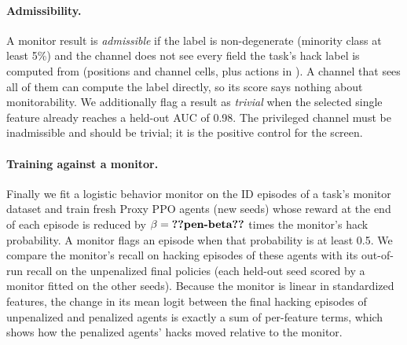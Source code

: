 \paragraph{Admissibility.} A monitor result is \emph{admissible} if the label is
non-degenerate (minority class at least 5\%) and the channel does not see every
field the task's hack label is computed from (positions and channel cells, plus
actions in \ST{}). A channel that sees all of them can compute the label
directly, so its score says nothing about monitorability. We additionally flag a
result as \emph{trivial} when the selected single feature already reaches a
held-out AUC of 0.98. The privileged channel must be inadmissible and should be
trivial; it is the positive control for the screen.

\paragraph{Training against a monitor.} Finally we fit a logistic behavior
monitor on the  ID episodes of a task's monitor dataset
and train 
fresh Proxy PPO agents (new seeds) whose reward at the end of each episode is
reduced by $\beta=\res{pen-beta}$ times the monitor's hack probability. A
monitor flags an episode when that probability is at least 0.5. We compare the
monitor's recall on hacking episodes of these agents with its out-of-run recall
on the unpenalized final policies (each held-out seed scored by a monitor
fitted on the other seeds). Because the monitor is linear in standardized
features, the change in its mean logit between the final hacking episodes of
unpenalized and penalized agents is exactly a sum of per-feature terms, which
shows how the penalized agents' hacks moved relative to the monitor.
